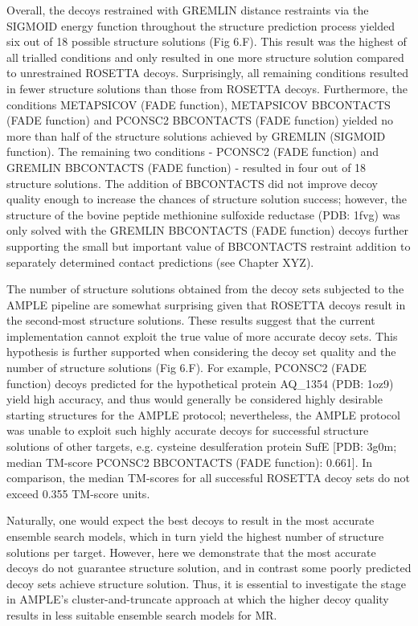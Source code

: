 Overall, the decoys restrained with GREMLIN distance restraints via the SIGMOID energy function throughout the structure prediction process yielded six out of 18 possible structure solutions (Fig 6.F). This result was the highest of all trialled conditions and only resulted in one more structure solution compared to unrestrained ROSETTA decoys. Surprisingly, all remaining conditions resulted in fewer structure solutions than those from ROSETTA decoys. Furthermore, the conditions METAPSICOV (FADE function), METAPSICOV BBCONTACTS (FADE function) and PCONSC2 BBCONTACTS (FADE function) yielded no more than half of the structure solutions achieved by GREMLIN (SIGMOID function). The remaining two conditions - PCONSC2 (FADE function) and GREMLIN BBCONTACTS (FADE function) - resulted in four out of 18 structure solutions. The addition of BBCONTACTS did not improve decoy quality enough to increase the chances of structure solution success; however, the structure of the bovine peptide methionine sulfoxide reductase (PDB: 1fvg) was only solved with the GREMLIN BBCONTACTS (FADE function) decoys further supporting the small but important value of BBCONTACTS restraint addition to separately determined contact predictions (see Chapter XYZ).

The number of structure solutions obtained from the decoy sets subjected to the AMPLE pipeline are somewhat surprising given that ROSETTA decoys result in the second-most structure solutions. These results suggest that the current implementation cannot exploit the true value of more accurate decoy sets. This hypothesis is further supported when considering the decoy set quality and the number of structure solutions (Fig 6.F). For example, PCONSC2 (FADE function) decoys predicted for the hypothetical protein AQ\_1354 (PDB: 1oz9) yield high accuracy, and thus would generally be considered highly desirable starting structures for the AMPLE protocol; nevertheless, the AMPLE protocol was unable to exploit such highly accurate decoys for successful structure solutions of other targets, e.g. cysteine desulferation protein SufE [PDB: 3g0m; median TM-score PCONSC2 BBCONTACTS (FADE function): 0.661]. In comparison, the median TM-scores for all successful ROSETTA decoy sets do not exceed 0.355 TM-score units.

Naturally, one would expect the best decoys to result in the most accurate ensemble search models, which in turn yield the highest number of structure solutions per target. However, here we demonstrate that the most accurate decoys do not guarantee structure solution, and in contrast some poorly predicted decoy sets achieve structure solution. Thus, it is essential to investigate the stage in AMPLE’s cluster-and-truncate approach at which the higher decoy quality results in less suitable ensemble search models for MR.

